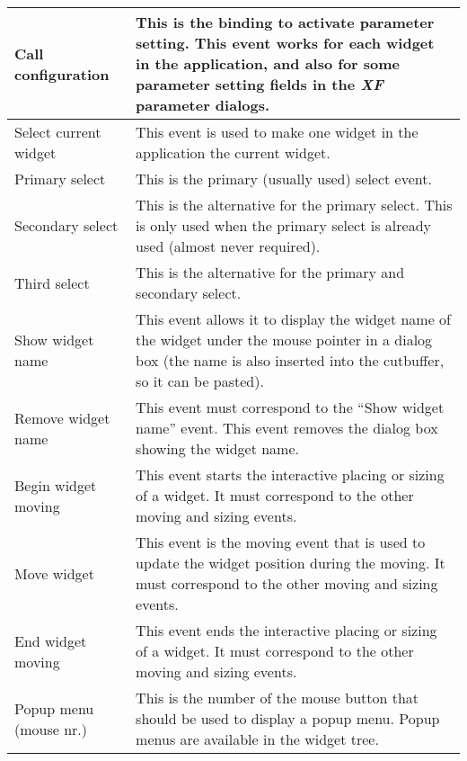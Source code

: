 {\newpage
\clearpage
\samepage \begin{supertabular}{|l|p{6.8cm}|}
Call configuration     & This is the binding to activate
                         parameter setting. This event works
                         for each widget in the application,
                         and also for some parameter setting
                         fields in the {\em XF }
 parameter
                         dialogs.\\  \hline
Select current widget  & This event is used to make one
                         widget in the application the
                         current widget.\\  \hline
Primary select         & This is the primary (usually used)
                         select event.\\  \hline
Secondary select       & This is the alternative for the
                         primary select. This is only used
                         when the primary select is already
                         used (almost never required).\\  \hline
Third select           & This is the alternative for the
                         primary and secondary select.\\  \hline
Show widget name       & This event allows it to display
                         the widget name of the widget under
                         the mouse pointer in a dialog box
                         (the name is also inserted into the
                         cutbuffer, so it can be pasted).\\  \hline
Remove widget name     & This event must correspond to the
                         ``Show widget name'' event. This
                         event removes the dialog box
                         showing the widget name.\\  \hline
Begin widget moving    & This event starts the interactive
                         placing or sizing of a widget. It
                         must correspond to the other
                         moving and sizing events.\\  \hline
Move widget            & This event is the moving event that
                         is used to update the widget
                         position during the moving. It must
                         correspond to the other
                         moving and sizing events.\\  \hline
End widget moving      & This event ends the interactive
                         placing or sizing of a widget. It
                         must correspond to the other
                         moving and sizing events.\\  \hline
Popup menu (mouse nr.) & This is the number of the mouse
                         button that should be used to
                         display a popup menu. Popup menus
                         are available in the widget tree.\\
\end{supertabular}
}

